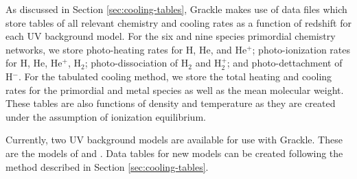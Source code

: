 As discussed in Section \ref{sec:cooling-tables}, Grackle makes use of
data files which store tables of all relevant chemistry and cooling
rates as a function of redshift for each UV background model.  For the
six and nine species primordial chemistry networks, we store
photo-heating rates for H, He, and He$^{+}$; photo-ionization rates
for H, He, He$^{+}$, H$_{2}$; photo-dissociation of H$_{2}$ and
H$_{2}^{+}$; and photo-dettachment of H$^{-}$.  For the tabulated
cooling method, we store the total heating and cooling rates for the
primordial and metal species as well as the mean molecular weight.
These tables are also functions of density and temperature as they are
created under the assumption of ionization equilibrium.

Currently, two UV background models are available for use with
Grackle.  These are the models of \citet{2009ApJ...703.1416F} and
\citet{2012ApJ...746..125H}.  Data tables for new models can be
created following the method described in Section
\ref{sec:cooling-tables}.
